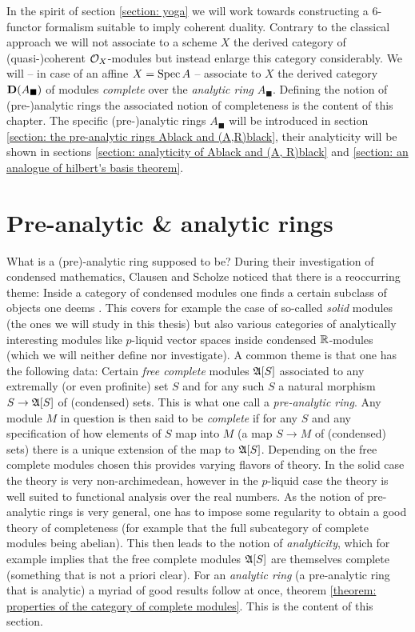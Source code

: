 

In the spirit of section \ref{section: yoga} we will work towards constructing a $6$-functor formalism suitable to imply coherent duality. Contrary to the classical approach we will not associate to a scheme $X$ the derived category of (quasi-)coherent ${{\mathcal{O}}_{X}}$-modules but instead enlarge this category considerably. We will -- in case of an affine $X=\operatorname{Spec} A$ -- associate to $X$ the derived category ${{\mathbf{D}}(A_\blacksquare)}$ of modules \emph{complete} over the \emph{analytic ring} $A_\blacksquare$. Defining the notion of (pre-)analytic rings the associated notion of completeness is the content of this chapter. The specific (pre-)analytic rings $A_\blacksquare$ will be introduced in section \ref{section: the pre-analytic rings Ablack and (A,R)black}, their analyticity will be shown in sections \ref{section: analyticity of Ablack and (A, R)black} and \ref{section: an analogue of hilbert's basis theorem}.

\section{Pre-analytic \& analytic rings}
\label{section: pre-analytic and analytic rings}

What is a (pre)-analytic ring supposed to be? During their investigation of condensed mathematics, Clausen and Scholze noticed that there is a reoccurring theme: Inside a category of condensed modules one finds a certain subclass of  objects one deems . This covers for example the case of so-called \emph{solid} modules (the ones we will study in this thesis) but also various categories of analytically interesting modules like $p$-liquid vector spaces inside condensed ${\mathbb{R}}$-modules (which we will neither define nor investigate). A common theme is that one has the following data: Certain \emph{free complete} modules ${{{\mathfrak{A}}[S]}}$ associated to any extremally (or even profinite) set $S$ and for any such $S$ a natural morphism $S\to {{{\mathfrak{A}}[S]}}$ of (condensed) sets. This is what one call a \emph{pre-analytic ring}. Any module $M$ in question is then said to be \emph{complete} if for any $S$ and any specification of how elements of $S$ map into $M$ (\ie a map $S\to M$ of (condensed) sets) there is a unique extension of the map to ${{{\mathfrak{A}}[S]}}$. Depending on the free complete modules chosen this provides varying flavors of theory. In the solid case the theory is very non-archimedean, however in the $p$-liquid case the theory is well suited to  functional analysis over the real numbers. As the notion of pre-analytic rings is very general, one has to impose some regularity to obtain a good theory of completeness (for example that the full subcategory of complete modules being abelian). This then leads to the notion of \emph{analyticity}, which for example implies that the free complete modules ${{{\mathfrak{A}}[S]}}$ are themselves complete (something that is not a priori clear). For an \emph{analytic ring} (a pre-analytic ring that is analytic) a myriad of good results follow at once, \confer theorem \ref{theorem: properties of the category of complete modules}. This is the content of this section.

